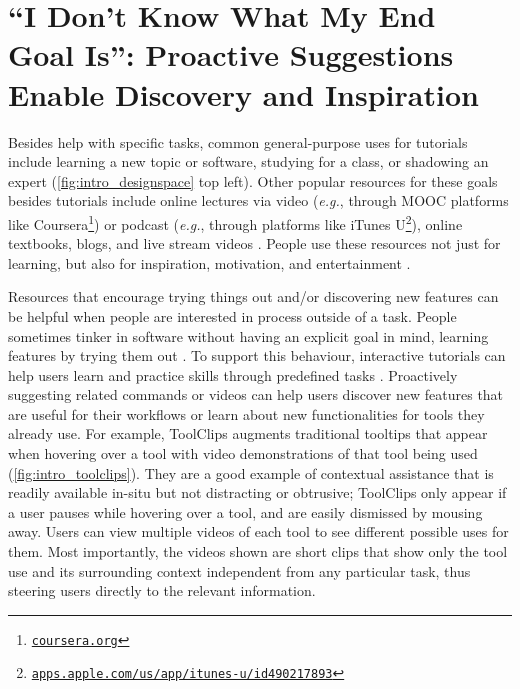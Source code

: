 \section{``I Don't Know What My End Goal Is'': Proactive Suggestions Enable Discovery and Inspiration}
Besides help with specific tasks, common general-purpose uses for tutorials include learning a new topic or software, studying for a class, or shadowing an expert \cite{Lafreniere2013a} (\autoref{fig:intro_designspace} top left). Other popular resources for these goals besides tutorials include online lectures via video (\textit{e.g.}, through MOOC platforms like Coursera\footnote{\href{https://www.coursera.org/}{\nolinkurl{coursera.org}}}) or podcast (\textit{e.g.}, through platforms like iTunes U\footnote{\href{https://apps.apple.com/us/app/itunes-u/id490217893}{\nolinkurl{apps.apple.com/us/app/itunes-u/id490217893}}}), online textbooks, blogs, and live stream videos \cite{Lu2019}. People use these resources not just for learning, but also for inspiration, motivation, and entertainment \cite{Lu2018, Hilvert-Bruce2018, Lu2019, Cheung2011}.

Resources that encourage trying things out and/or discovering new features can be helpful when people are interested in process outside of a task. People sometimes tinker in software without having an explicit goal in mind, learning features by trying them out \cite{Burnett2016, Carroll1987}. To support this behaviour, interactive tutorials can help users learn and practice skills through predefined tasks \cite{Dontcheva2014, Lafreniere2014a, Kelleher2005}. Proactively suggesting related commands \cite{Li2011, Matejka2009} or videos \cite{Grossman2010a, Matejka2011} can help users discover new features that are useful for their workflows or learn about new functionalities for tools they already use. For example, ToolClips \cite{Grossman2010a} augments traditional tooltips that appear when hovering over a tool with video demonstrations of that tool being used (\autoref{fig:intro_toolclips}). They are a good example of contextual assistance that is readily available in-situ but not distracting or obtrusive; ToolClips only appear if a user pauses while hovering over a tool, and are easily dismissed by mousing away. Users can view multiple videos of each tool to see different possible uses for them. Most importantly, the videos shown are short clips that show only the tool use and its surrounding context independent from any particular task, thus steering users directly to the relevant information. 

